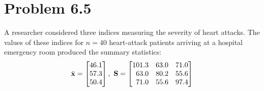 


\maketitle

\section*{Problem 6.5} 
A researcher considered three indices measuring the severity of heart attacks. The values of these indices for $n=40$ heart-attack patients arriving at a hospital emergency room produced the summary statistics: $$\bar{\bf{x}}=\m{46.1\\57.3\\50.4},\ \mf{S}=\m{101.3&63.0&71.0\\63.0&80.2&55.6\\71.0&55.6&97.4}$$

